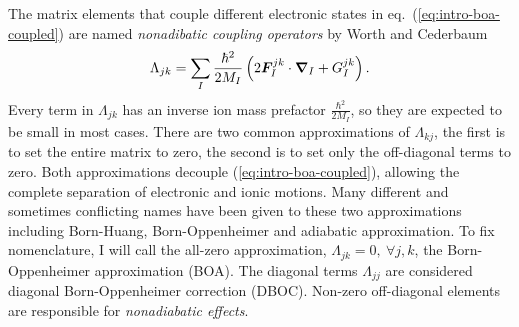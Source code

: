 The matrix elements that couple different electronic states in eq.~(\ref{eq:intro-boa-coupled}) are named \emph{nonadibatic coupling operators} by Worth and Cederbaum~\cite{Worth2004}
\begin{align} \label{eq:intro-boa-nona}
\Lambda_{jk} = \sum_I \frac{\hbar^2}{2M_I}\left(2\boldsymbol{F}_I^{jk}\cdot\boldsymbol{\nabla}_I+G_I^{jk}\right).
\end{align}
Every term in $\Lambda_{jk}$ has an inverse ion mass prefactor $\frac{\hbar^2}{2M_I}$, so they are expected to be small in most cases. There are two common approximations of $\Lambda_{kj}$, the first is to set the entire matrix to zero, the second is to set only the off-diagonal terms to zero. Both approximations decouple (\ref{eq:intro-boa-coupled}), allowing the complete separation of electronic and ionic motions.
Many different and sometimes conflicting names have been given to these two approximations including Born-Huang, Born-Oppenheimer and adiabatic approximation.
To fix nomenclature, I will call the all-zero approximation, $\Lambda_{jk}=0,~\forall j, k$, the Born-Oppenheimer approximation (BOA).
The diagonal terms $\Lambda_{jj}$ are considered diagonal Born-Oppenheimer correction (DBOC).
Non-zero off-diagonal elements are responsible for \textit{nonadiabatic effects}.

